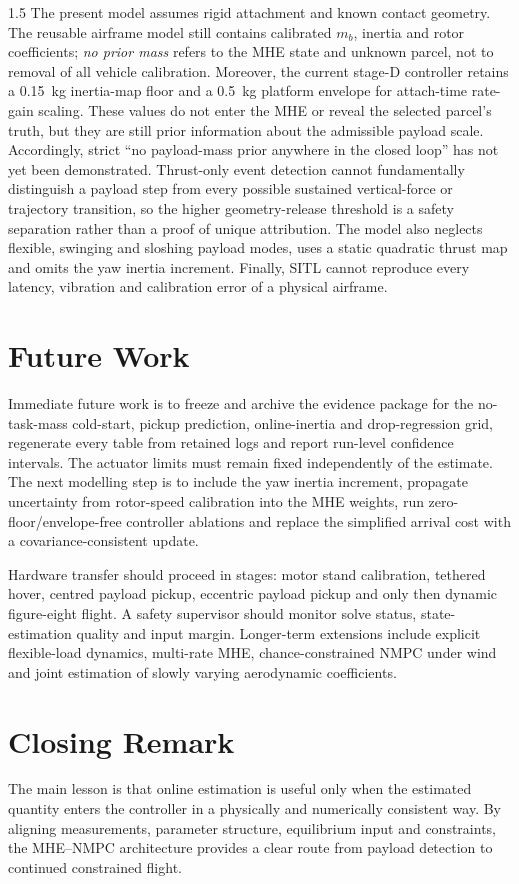 \begin{spacing}{1.5}
The present model assumes rigid attachment and known contact geometry.
The reusable airframe model still contains calibrated $m_b$, inertia and
rotor coefficients; \emph{no prior mass} refers to the MHE state and
unknown parcel, not to removal of all vehicle calibration. Moreover, the
current stage-D controller retains a \SI{0.15}{kg} inertia-map floor and
a \SI{0.5}{kg} platform envelope for attach-time rate-gain scaling. These
values do not enter the MHE or reveal the selected parcel's truth, but
they are still prior information about the admissible payload scale.
Accordingly, strict ``no payload-mass prior anywhere in the closed loop''
has not yet been demonstrated. Thrust-only
event detection cannot fundamentally distinguish a payload step from
every possible sustained vertical-force or trajectory transition, so
the higher geometry-release threshold is a safety separation rather than
a proof of unique attribution. The model also neglects flexible,
swinging and sloshing payload modes, uses a static quadratic thrust map
and omits the yaw inertia increment. Finally, SITL cannot reproduce every
latency, vibration and calibration error of a physical airframe.

\section{Future Work}

Immediate future work is to freeze and archive the evidence package for
the no-task-mass cold-start, pickup prediction, online-inertia and drop-regression grid,
regenerate every table from retained logs and report run-level confidence
intervals. The actuator limits must remain fixed independently of the
estimate. The next modelling step is to include the yaw inertia
increment, propagate uncertainty from rotor-speed calibration into the
MHE weights, run zero-floor/envelope-free controller ablations and replace the simplified arrival cost with a
covariance-consistent update.

Hardware transfer should proceed in stages: motor stand calibration, tethered hover, centred payload pickup, eccentric payload pickup and only then dynamic figure-eight flight. A safety supervisor should monitor solve status, state-estimation quality and input margin. Longer-term extensions include explicit flexible-load dynamics, multi-rate MHE, chance-constrained NMPC under wind and joint estimation of slowly varying aerodynamic coefficients.

\section{Closing Remark}

The main lesson is that online estimation is useful only when the estimated quantity enters the controller in a physically and numerically consistent way. By aligning measurements, parameter structure, equilibrium input and constraints, the MHE--NMPC architecture provides a clear route from payload detection to continued constrained flight.

\end{spacing}
\newpage
